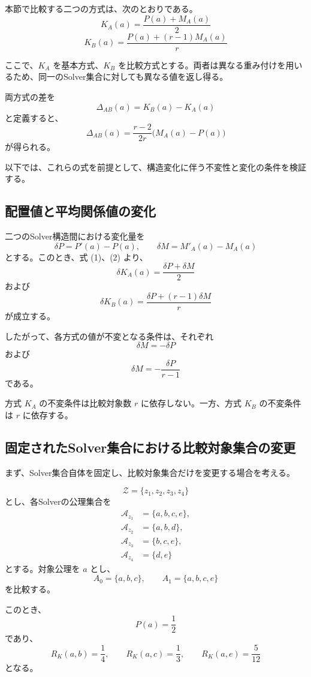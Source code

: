 \documentclass[a4paper,11pt]{ltjsarticle}
\begin{document}
本節で比較する二つの方式は、次のとおりである。
\[
\boxed{
K_A(a)=\frac{P(a)+M_A(a)}{2}
}
\tag{1}
\]
\[
\boxed{
K_B(a)=
\frac{P(a)+(r-1)M_A(a)}{r}
}
\tag{2}
\]

ここで、$K_A$ を基本方式、$K_B$ を比較方式とする。両者は異なる重み付けを用いるため、同一のSolver集合に対しても異なる値を返し得る。

両方式の差を
\[
\Delta_{AB}(a)=K_B(a)-K_A(a)
\]
と定義すると、
\[
\boxed{
\Delta_{AB}(a)=
\frac{r-2}{2r}\bigl(M_A(a)-P(a)\bigr)
}
\tag{3}
\]
が得られる。

以下では、これらの式を前提として、構造変化に伴う不変性と変化の条件を検証する。

\subsection{配置値と平均関係値の変化}

二つのSolver構造間における変化量を
\[
\delta P=P'(a)-P(a),\qquad
\delta M=M'_A(a)-M_A(a)
\]
とする。このとき、式 (1)、(2) より、
\[
\boxed{
\delta K_A(a)=\frac{\delta P+\delta M}{2}
}
\tag{4}
\]
および
\[
\boxed{
\delta K_B(a)=
\frac{\delta P+(r-1)\delta M}{r}
}
\tag{5}
\]
が成立する。

したがって、各方式の値が不変となる条件は、それぞれ
\[
\boxed{\delta M=-\delta P}
\tag{6}
\]
および
\[
\boxed{
\delta M=-\frac{\delta P}{r-1}
}
\tag{7}
\]
である。

方式 $K_A$ の不変条件は比較対象数 $r$ に依存しない。一方、方式 $K_B$ の不変条件は $r$ に依存する。

\subsection{固定されたSolver集合における比較対象集合の変更}

まず、Solver集合自体を固定し、比較対象集合だけを変更する場合を考える。

\[
\mathcal{Z}=\{z_1,z_2,z_3,z_4\}
\]
とし、各Solverの公理集合を
\[
\begin{aligned}
\mathcal{A}_{z_1}&=\{a,b,c,e\},\\
\mathcal{A}_{z_2}&=\{a,b,d\},\\
\mathcal{A}_{z_3}&=\{b,c,e\},\\
\mathcal{A}_{z_4}&=\{d,e\}
\end{aligned}
\]
とする。対象公理を $a$ とし、
\[
A_0=\{a,b,c\},\qquad
A_1=\{a,b,c,e\}
\]
を比較する。

このとき、
\[
P(a)=\frac12
\]
であり、
\[
R_K(a,b)=\frac14,\qquad
R_K(a,c)=\frac13,\qquad
R_K(a,e)=\frac5{12}
\]
となる。
\end{document}

